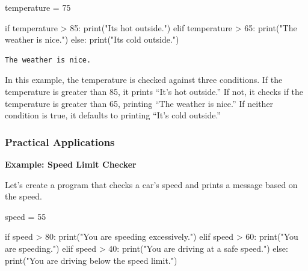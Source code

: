\documentclass[
  letterpaper,
  DIV=11,
  numbers=noendperiod]{scrreprt}
\newenvironment{Shaded}{\begin{snugshade}}{\end{snugshade}}
\newcommand{\BuiltInTok}[1]{\textcolor[rgb]{0.00,0.23,0.31}{#1}}
\newcommand{\ControlFlowTok}[1]{\textcolor[rgb]{0.00,0.23,0.31}{#1}}
\newcommand{\DecValTok}[1]{\textcolor[rgb]{0.68,0.00,0.00}{#1}}
\newcommand{\NormalTok}[1]{\textcolor[rgb]{0.00,0.23,0.31}{#1}}
\newcommand{\OperatorTok}[1]{\textcolor[rgb]{0.37,0.37,0.37}{#1}}
\newcommand{\StringTok}[1]{\textcolor[rgb]{0.13,0.47,0.30}{#1}}
\begin{document}
\begin{Shaded}
\begin{Highlighting}[]
\NormalTok{temperature }\OperatorTok{=} \DecValTok{75}

\ControlFlowTok{if}\NormalTok{ temperature }\OperatorTok{\textgreater{}} \DecValTok{85}\NormalTok{:}
    \BuiltInTok{print}\NormalTok{(}\StringTok{"It\textquotesingle{}s hot outside."}\NormalTok{)}
\ControlFlowTok{elif}\NormalTok{ temperature }\OperatorTok{\textgreater{}} \DecValTok{65}\NormalTok{:}
    \BuiltInTok{print}\NormalTok{(}\StringTok{"The weather is nice."}\NormalTok{)}
\ControlFlowTok{else}\NormalTok{:}
    \BuiltInTok{print}\NormalTok{(}\StringTok{"It\textquotesingle{}s cold outside."}\NormalTok{)}
\end{Highlighting}
\end{Shaded}

\begin{verbatim}
The weather is nice.
\end{verbatim}

In this example, the temperature is checked against three conditions. If
the temperature is greater than 85, it prints ``It's hot outside.'' If
not, it checks if the temperature is greater than 65, printing ``The
weather is nice.'' If neither condition is true, it defaults to printing
``It's cold outside.''

\hypertarget{practical-applications}{%
\subsubsection{Practical Applications}\label{practical-applications}}

\textbf{Example: Speed Limit Checker}

Let's create a program that checks a car's speed and prints a message
based on the speed.

\begin{Shaded}
\begin{Highlighting}[]
\NormalTok{speed }\OperatorTok{=} \DecValTok{55}

\ControlFlowTok{if}\NormalTok{ speed }\OperatorTok{\textgreater{}} \DecValTok{80}\NormalTok{:}
    \BuiltInTok{print}\NormalTok{(}\StringTok{"You are speeding excessively."}\NormalTok{)}
\ControlFlowTok{elif}\NormalTok{ speed }\OperatorTok{\textgreater{}} \DecValTok{60}\NormalTok{:}
    \BuiltInTok{print}\NormalTok{(}\StringTok{"You are speeding."}\NormalTok{)}
\ControlFlowTok{elif}\NormalTok{ speed }\OperatorTok{\textgreater{}} \DecValTok{40}\NormalTok{:}
    \BuiltInTok{print}\NormalTok{(}\StringTok{"You are driving at a safe speed."}\NormalTok{)}
\ControlFlowTok{else}\NormalTok{:}
    \BuiltInTok{print}\NormalTok{(}\StringTok{"You are driving below the speed limit."}\NormalTok{)}
\end{Highlighting}
\end{Shaded}
\end{document}
